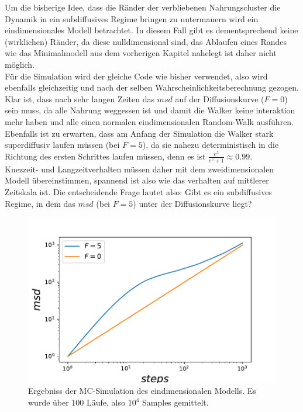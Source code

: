 \documentclass[a4paper, 12pt]{scrartcl}
\begin{document}
Um die bisherige Idee, dass die Ränder der verbliebenen Nahrungscluster die Dynamik in ein subdiffusives Regime bringen zu untermauern wird ein eindimensionales Modell betrachtet. In diesem Fall gibt es dementsprechend keine (wirklichen) Ränder, da diese nulldimensional sind, das Ablaufen eines Randes wie das Minimalmodell aus dem vorherigen Kapitel nahelegt ist daher nicht möglich. 
\\
Für die Simulation wird der gleiche Code wie bisher verwendet, also wird ebenfalls gleichzeitig und nach der selben Wahrscheinlichkeitsberechnung gezogen. 
\\
Klar ist, dass nach sehr langen Zeiten das $msd$ auf der Diffusionskurve ($F=0$) sein muss, da alle Nahrung weggessen ist und damit die Walker keine interaktion mehr haben und alle einen normalen eindimensionalen Random-Walk ausführen.
\\
Ebenfalls ist zu erwarten, dass am Anfang der Simulation die Walker stark superdiffusiv laufen müssen (bei $F=5$), da sie nahezu deterministisch in die Richtung des ersten Schrittes laufen müssen, denn es ist $\frac{e^5}{e^5 + 1} \approx 0.99$. 
\\
Kuezzeit- und Langzeitverhalten müssen daher mit dem zweidimensionalen Modell übereinstimmen, spannend ist also wie das verhalten auf mittlerer Zeitskala ist. Die entscheidende Frage lautet also: Gibt es ein subdiffusives Regime, in dem das $msd$ (bei $F=5$) unter der Diffusionskurve liegt? 

\begin{figure}[H]
	\centering
	\includegraphics[scale=0.85]{onedmsd.pdf}
	\caption{Ergebniss der MC-Simulation des eindimensionalen Modells. Es wurde über 100 Läufe, also $10^4$ Samples gemittelt.}
\end{figure}
\end{document}
